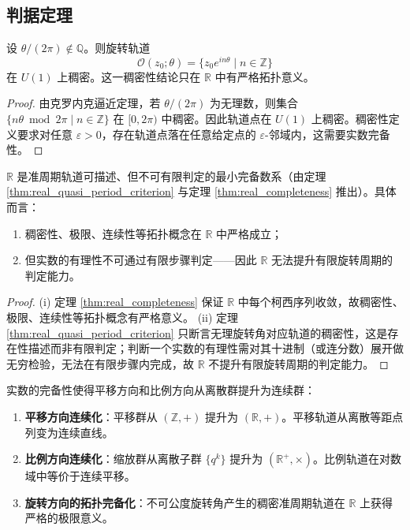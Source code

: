 \subsection{\texorpdfstring{判据定理}{判据定理}}

\begin{theorem}[实数准周期判据]\label{thm:real_quasi_period_criterion}
设 $\theta/(2\pi) \notin \mathbb{Q}$。则旋转轨道
\[
\mathcal{O}(z_0;\theta) = \{z_0 e^{in\theta} \mid n\in\mathbb{Z}\}
\]
在 $U(1)$ 上稠密。这一稠密性结论只在 $\mathbb{R}$ 中有严格拓扑意义。
\end{theorem}

\begin{proof}
由克罗内克逼近定理，若 $\theta/(2\pi)$ 为无理数，则集合 $\{n\theta \bmod 2\pi \mid n\in\mathbb{Z}\}$ 在 $[0,2\pi)$ 中稠密。因此轨道点在 $U(1)$ 上稠密。稠密性定义要求对任意 $\varepsilon > 0$，存在轨道点落在任意给定点的 $\varepsilon$-邻域内，这需要实数完备性。
\end{proof}

\begin{corollary}[实数与准周期]\label{cor:real_quasi_period}
$\mathbb{R}$ 是准周期轨道可描述、但不可有限判定的最小完备数系（由定理 \ref{thm:real_quasi_period_criterion} 与定理 \ref{thm:real_completeness} 推出）。具体而言：
\begin{enumerate}[label=(\roman*)]
    \item 稠密性、极限、连续性等拓扑概念在 $\mathbb{R}$ 中严格成立；
    \item 但实数的有理性不可通过有限步骤判定——因此 $\mathbb{R}$ 无法提升有限旋转周期的判定能力。
\end{enumerate}
\end{corollary}

\begin{proof}
(i) 定理 \ref{thm:real_completeness} 保证 $\mathbb{R}$ 中每个柯西序列收敛，故稠密性、极限、连续性等拓扑概念有严格意义。
(ii) 定理 \ref{thm:real_quasi_period_criterion} 只断言无理旋转角对应轨道的稠密性，这是存在性描述而非有限判定；判断一个实数的有理性需对其十进制（或连分数）展开做无穷检验，无法在有限步骤内完成，故 $\mathbb{R}$ 不提升有限旋转周期的判定能力。
\end{proof}

\begin{proposition}[实数完备化对方向结构的影响]\label{prop:real_completion_direction}
实数的完备性使得平移方向和比例方向从离散群提升为连续群：
\begin{enumerate}[label=(\roman*)]
    \item \textbf{平移方向连续化}：平移群从 $(\mathbb{Z},+)$ 提升为 $(\mathbb{R},+)$。平移轨道从离散等距点列变为连续直线。
    \item \textbf{比例方向连续化}：缩放群从离散子群 $\{q^k\}$ 提升为 $(\mathbb{R}^+,\times)$。比例轨道在对数域中等价于连续平移。
    \item \textbf{旋转方向的拓扑完备化}：不可公度旋转角产生的稠密准周期轨道在 $\mathbb{R}$ 上获得严格的极限意义。
\end{enumerate}
\end{proposition}

